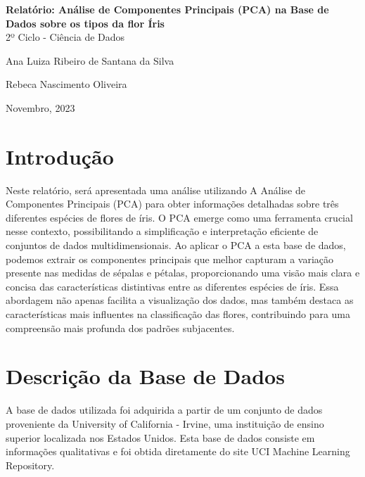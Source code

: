 \documentclass{article}
\begin{document}
\begin{titlepage}

    \centering
    \vspace*{8cm}

     \Large {\bfseries Relatório: Análise de Componentes Principais (PCA) na Base de Dados sobre os tipos da flor Íris}\\

    \vspace{1cm}
    \Large 2º Ciclo - Ciência de Dados
    
    \vspace{0.5cm}
    \Large Ana Luiza Ribeiro de Santana da Silva

    \Large Rebeca Nascimento Oliveira 
    
    \vspace{1cm}
    \Large Novembro, 2023
    

\end{titlepage}

\section*{Introdução}

Neste relatório, será apresentada uma análise utilizando A Análise de Componentes Principais (PCA) para obter informações detalhadas sobre três diferentes espécies de flores de íris. O PCA emerge como uma ferramenta crucial nesse contexto, possibilitando a simplificação e interpretação eficiente de conjuntos de dados multidimensionais. Ao aplicar o PCA a esta base de dados, podemos extrair os componentes principais que melhor capturam a variação presente nas medidas de sépalas e pétalas, proporcionando uma visão mais clara e concisa das características distintivas entre as diferentes espécies de íris. Essa abordagem não apenas facilita a visualização dos dados, mas também destaca as características mais influentes na classificação das flores, contribuindo para uma compreensão mais profunda dos padrões subjacentes.

\vspace*{1cm}

\section*{Descrição da Base de Dados}

A base de dados utilizada foi adquirida a partir de um conjunto de dados proveniente da University of California - Irvine, uma instituição de ensino superior localizada nos Estados Unidos. Esta base de dados consiste em informações qualitativas e foi obtida diretamente do site UCI Machine Learning Repository.
\end{document}
